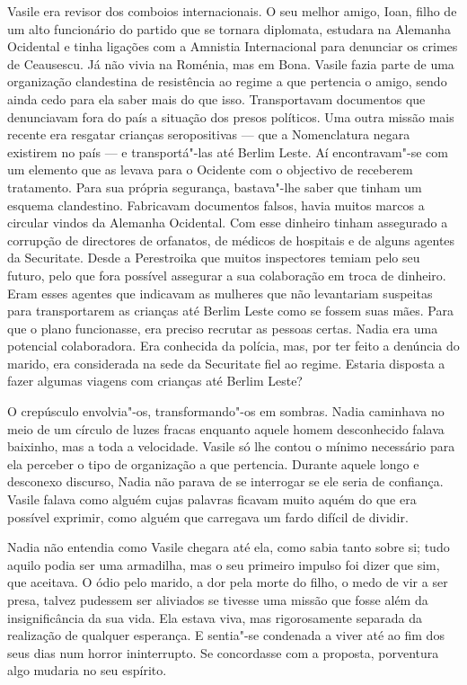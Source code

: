 Vasile era revisor dos comboios internacionais. O seu melhor amigo,
Ioan, filho de um alto funcionário do partido que se tornara
diplomata, estudara na Alemanha Ocidental e tinha ligações com a
Amnistia Internacional para denunciar os crimes de Ceausescu. Já não
vivia na Roménia, mas em Bona. Vasile fazia parte de uma organização
clandestina de resistência ao regime a que pertencia o amigo, sendo
ainda cedo para ela saber mais do que isso. Transportavam documentos que
denunciavam fora do país a situação dos presos políticos. Uma outra
missão mais recente era resgatar crianças seropositivas --- que a
Nomenclatura negara existirem no país --- e transportá"-las até Berlim
Leste. Aí encontravam"-se com um elemento que as levava para o Ocidente
com o objectivo de receberem tratamento. Para sua própria segurança,
bastava"-lhe saber que tinham um esquema clandestino. Fabricavam documentos falsos, havia muitos marcos a circular vindos da Alemanha
Ocidental. Com esse dinheiro tinham assegurado a corrupção de
directores de orfanatos, de médicos de hospitais e de alguns agentes da
Securitate. Desde a Perestroika que muitos inspectores temiam pelo seu
futuro,
pelo que fora possível assegurar a sua colaboração em troca de dinheiro.
Eram esses agentes que indicavam as mulheres que não levantariam
suspeitas para transportarem as crianças até Berlim Leste como se
fossem suas mães. Para que o plano funcionasse, era preciso recrutar as
pessoas certas. Nadia era uma potencial colaboradora. Era conhecida da
polícia, mas, por ter feito a denúncia do marido, era considerada na
sede da Securitate fiel ao regime. Estaria disposta a fazer algumas
viagens com crianças até Berlim Leste?

O crepúsculo envolvia"-os, transformando"-os em sombras. Nadia caminhava
no meio de um círculo de luzes fracas enquanto aquele homem desconhecido
falava baixinho, mas a toda a velocidade. Vasile só lhe contou o mínimo
necessário para ela perceber o tipo de organização a que pertencia.
Durante aquele longo e desconexo discurso, Nadia não parava de se
interrogar se ele seria de confiança. Vasile falava como alguém cujas
palavras ficavam muito aquém do que era possível exprimir, como alguém
que carregava um fardo difícil de dividir.

Nadia não entendia como
Vasile chegara até ela, como sabia tanto sobre si; tudo aquilo podia ser
uma armadilha, mas o seu primeiro impulso foi dizer que sim, que
aceitava. O ódio pelo marido, a dor pela morte do filho, o medo de vir a
ser presa, talvez pudessem ser aliviados se tivesse uma missão que fosse
além da insignificância da sua vida. Ela estava viva, mas rigorosamente
separada da realização de qualquer esperança. E sentia"-se condenada a
viver até ao fim dos seus dias num horror ininterrupto. Se concordasse
com a proposta, porventura algo mudaria no seu espírito.

